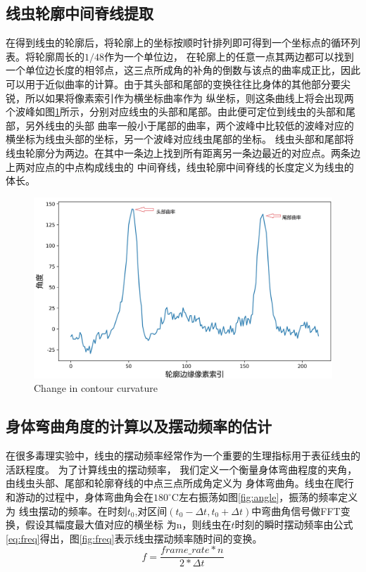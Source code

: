 \subsection{线虫轮廓中间脊线提取}
	在得到线虫的轮廓后，将轮廓上的坐标按顺时针排列即可得到一个坐标点的循环列表。将轮廓周长的$1/48$作为一个单位边，
	在轮廓上的任意一点其两边都可以找到一个单位边长度的相邻点，这三点所成角的补角的倒数与该点的曲率成正比，因此
	可以用于近似曲率的计算。由于其头部和尾部的变换往往比身体的其他部分要尖锐，所以如果将像素索引作为横坐标曲率作为
	纵坐标，则这条曲线上将会出现两个波峰如图\ref{fig:qulv}所示，分别对应线虫的头部和尾部。由此便可定位到线虫的头部和尾部，另外线虫的头部
	曲率一般小于尾部的曲率，两个波峰中比较低的波峰对应的横坐标为线虫头部的坐标，另一个波峰对应线虫尾部的坐标。
	线虫头部和尾部将线虫轮廓分为两边。在其中一条边上找到所有距离另一条边最近的对应点。两条边上两对应点的中点构成线虫的
	中间脊线，线虫轮廓中间脊线的长度定义为线虫的体长。
	\begin{figure}[h]
	  \centering
	  \includegraphics[width=14cm]{figure/chap3/qulv.jpg}
		{Change in contour curvature}
	  \label{fig:qulv}
	\end{figure}
\subsection{身体弯曲角度的计算以及摆动频率的估计}
	在很多毒理实验中，线虫的摆动频率经常作为一个重要的生理指标用于表征线虫的活跃程度\cite{Wang2008Assessment}。
	为了计算线虫的摆动频率， 我们定义一个衡量身体弯曲程度的夹角，由线虫头部、尾部和轮廓脊线的中点三点所成角定义为
	身体弯曲角。线虫在爬行和游动的过程中，身体弯曲角会在$180^\circ$C左右振荡如图\ref{fig:angle}，振荡的频率定义为
	线虫摆动的频率。在时刻$t_0$,对区间$(t_0-\Delta t,t_0+\Delta t)$中弯曲角信号做FFT变换，假设其幅度最大值对应的横坐标
	为n，则线虫在$t$时刻的瞬时摆动频率由公式\ref{eq:freq}得出，图\ref{fig:freq}表示线虫摆动频率随时间的变换。
	\begin{equation}
        f=\frac{frame\_rate*n}{2*\Delta t} \label{eq:freq}
	\end{equation}
		
